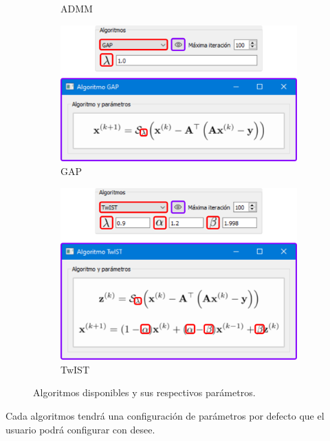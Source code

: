 \documentclass[12pt,oneside,a4]{ol-softwaremanual}
\begin{document}
\begin{figure}[!ht]
\begin{subfigure}[b]{0.45\textwidth}
         \caption{ADMM}
         \label{fig:admm}
     \end{subfigure}
     \begin{subfigure}[b]{0.45\textwidth}
         \centering
         \includegraphics[width=\textwidth]{algorithm-gap.png}
         \caption{GAP}
         \label{fig:gap}
     \end{subfigure}
     \hfill
     \begin{subfigure}[b]{0.45\textwidth}
         \centering
         \includegraphics[width=\textwidth]{algorithm-twist.png}
         \caption{TwIST}
         \label{fig:twist}
     \end{subfigure}
        \caption{Algoritmos disponibles y sus respectivos parámetros.}
        \label{fig:algorithms}
\end{figure}

Cada algoritmos tendrá una configuración de parámetros por defecto que el usuario podrá configurar con desee.
\end{document}
